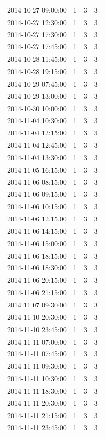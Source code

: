 \begin{tabular}{lrrr}
2014-10-27 09:00:00 & 1 & 3 & 3 \\
2014-10-27 12:30:00 & 1 & 3 & 3 \\
2014-10-27 17:30:00 & 1 & 3 & 3 \\
2014-10-27 17:45:00 & 1 & 3 & 3 \\
2014-10-28 11:45:00 & 1 & 3 & 3 \\
2014-10-28 19:15:00 & 1 & 3 & 3 \\
2014-10-29 07:45:00 & 1 & 3 & 3 \\
2014-10-29 13:00:00 & 1 & 3 & 3 \\
2014-10-30 10:00:00 & 1 & 3 & 3 \\
2014-11-04 10:30:00 & 1 & 3 & 3 \\
2014-11-04 12:15:00 & 1 & 3 & 3 \\
2014-11-04 12:45:00 & 1 & 3 & 3 \\
2014-11-04 13:30:00 & 1 & 3 & 3 \\
2014-11-05 16:15:00 & 1 & 3 & 3 \\
2014-11-06 08:15:00 & 1 & 3 & 3 \\
2014-11-06 09:15:00 & 1 & 3 & 3 \\
2014-11-06 10:15:00 & 1 & 3 & 3 \\
2014-11-06 12:15:00 & 1 & 3 & 3 \\
2014-11-06 14:15:00 & 1 & 3 & 3 \\
2014-11-06 15:00:00 & 1 & 3 & 3 \\
2014-11-06 18:15:00 & 1 & 3 & 3 \\
2014-11-06 18:30:00 & 1 & 3 & 3 \\
2014-11-06 20:15:00 & 1 & 3 & 3 \\
2014-11-06 21:15:00 & 1 & 3 & 3 \\
2014-11-07 09:30:00 & 1 & 3 & 3 \\
2014-11-10 20:30:00 & 1 & 3 & 3 \\
2014-11-10 23:45:00 & 1 & 3 & 3 \\
2014-11-11 07:00:00 & 1 & 3 & 3 \\
2014-11-11 07:45:00 & 1 & 3 & 3 \\
2014-11-11 09:30:00 & 1 & 3 & 3 \\
2014-11-11 10:30:00 & 1 & 3 & 3 \\
2014-11-11 18:30:00 & 1 & 3 & 3 \\
2014-11-11 20:30:00 & 1 & 3 & 3 \\
2014-11-11 21:15:00 & 1 & 3 & 3 \\
2014-11-11 23:45:00 & 1 & 3 & 3 \\

\end{tabular}
